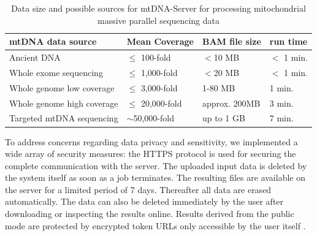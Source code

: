 \begin{table}[h]
\centering
\caption{Data size and possible sources for mtDNA-Server for processing mitochondrial massive parallel sequencing data \cite{Weissensteiner2016b}}
\label{mtDNAsource}
\begin{tabular}{llll}
\hline
mtDNA data source &  Mean Coverage & BAM file size & run time\\
\hline
Ancient DNA & $\leq$ 100-fold&  $<$10 MB  & $<$ 1 min.\\
Whole exome sequencing &$\leq$ 1,000-fold&  $<$20 MB  & $<$ 1 min.\\
Whole genome low coverage & $\leq$ 3,000-fold & 1-80 MB  & 1 min.\\
Whole genome high coverage & $\leq$ 20,000-fold & approx. 200MB & 3 min. \\
Targeted mtDNA sequencing &$\sim$50,000-fold & up to 1 GB  & 7 min.
\end{tabular}
\end{table}
To address concerns regarding data privacy and sensitivity, we implemented a wide array of security measures: the HTTPS protocol is used for securing the complete communication with the server. The uploaded input data is deleted  by the system itself as soon as a job terminates. The resulting files are available on the server for a limited period of 7 days. Thereafter all data are erased automatically. The data can also be deleted immediately by the user after downloading or inspecting the results online. Results derived from the public mode are protected by encrypted token URLs only accessible by the user itself \cite{Weissensteiner2016b}.

